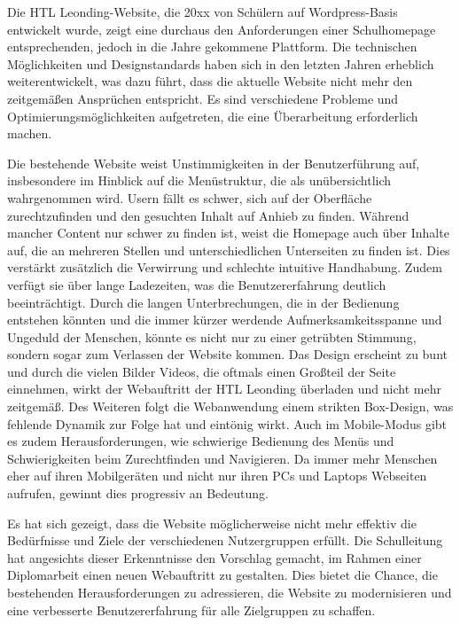 
Die HTL Leonding-Website, die 20xx von Schülern auf Wordpress-Basis entwickelt wurde, 
zeigt eine durchaus den Anforderungen einer Schulhomepage entsprechenden, 
jedoch in die Jahre gekommene Plattform. Die technischen Möglichkeiten und Designstandards haben 
sich in den letzten Jahren erheblich weiterentwickelt, was dazu führt, dass die aktuelle 
Website nicht mehr den zeitgemäßen Ansprüchen entspricht. Es sind verschiedene Probleme und 
Optimierungsmöglichkeiten aufgetreten, die eine Überarbeitung erforderlich machen.

Die bestehende Website weist Unstimmigkeiten in der Benutzerführung auf, 
insbesondere im Hinblick auf die Menüstruktur, die als unübersichtlich wahrgenommen wird. 
Usern fällt es schwer, sich auf der Oberfläche zurechtzufinden und den gesuchten Inhalt auf Anhieb zu finden. 
Während mancher Content nur schwer zu finden ist, weist die Homepage auch über Inhalte auf, 
die an mehreren Stellen und unterschiedlichen Unterseiten zu finden ist. Dies verstärkt zusätzlich 
die Verwirrung und schlechte intuitive Handhabung. Zudem verfügt sie über lange Ladezeiten, was die 
Benutzererfahrung deutlich beeinträchtigt. Durch die langen Unterbrechungen, 
die in der Bedienung entstehen könnten und die immer kürzer werdende Aufmerksamkeitsspanne und Ungeduld der Menschen, 
könnte es nicht nur zu einer getrübten Stimmung, sondern sogar zum Verlassen der Website kommen. Das Design erscheint 
zu bunt und durch die vielen Bilder Videos, die oftmals einen Großteil der Seite einnehmen, 
wirkt der Webauftritt der HTL Leonding überladen und nicht mehr zeitgemäß. Des Weiteren folgt die Webanwendung einem strikten
Box-Design, was fehlende Dynamik zur Folge hat und eintönig wirkt. Auch im Mobile-Modus gibt es zudem Herausforderungen,
wie schwierige Bedienung des Menüs und Schwierigkeiten beim Zurechtfinden und Navigieren. Da immer mehr Menschen eher auf 
ihren Mobilgeräten und nicht nur ihren PCs und Laptops Webseiten aufrufen, gewinnt dies progressiv an Bedeutung.

Es hat sich gezeigt, dass die Website möglicherweise nicht mehr effektiv die Bedürfnisse und 
Ziele der verschiedenen Nutzergruppen erfüllt. Die Schulleitung hat angesichts dieser Erkenntnisse den Vorschlag gemacht, 
im Rahmen einer Diplomarbeit einen neuen Webauftritt zu gestalten. Dies bietet die Chance, die bestehenden 
Herausforderungen zu adressieren, die Website zu modernisieren und eine verbesserte Benutzererfahrung für alle Zielgruppen zu schaffen.
